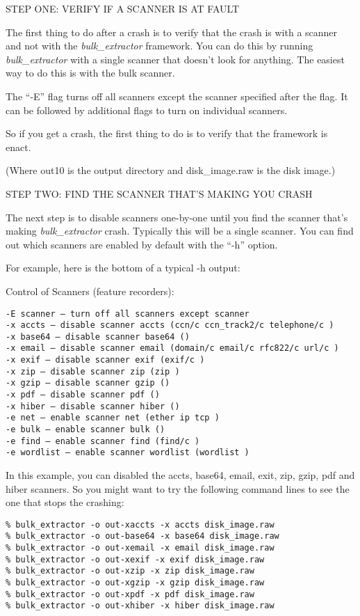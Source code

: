 \documentclass[10pt,twoside]{article}
\newcommand{\bulk}{\emph{bulk\_extractor}\xspace}
\begin{document}
STEP ONE: VERIFY IF A SCANNER IS AT FAULT

The first thing to do after a crash is to verify that the crash is with a scanner and not with the \bulk framework. You can do this by running \bulk with a single scanner that doesn’t look for anything. The easiest way to do this is with the bulk scanner.

The “-E” flag turns off all scanners except the scanner specified after the flag. It can be followed by additional flags to turn on individual scanners.

So if you get a crash, the first thing to do is to verify that the framework is enact.


(Where out10 is the output directory and disk\_image.raw is the disk image.)

STEP TWO: FIND THE SCANNER THAT’S MAKING YOU CRASH

The next step is to disable scanners one-by-one until you find the scanner that’s making \bulk crash. Typically this will be a single scanner. You can find out which scanners are enabled by default with the “-h” option.

For example, here is the bottom of a typical -h output:

Control of Scanners (feature recorders):
\begin{verbatim}
-E scanner – turn off all scanners except scanner
-x accts – disable scanner accts (ccn/c ccn_track2/c telephone/c )
-x base64 – disable scanner base64 ()
-x email – disable scanner email (domain/c email/c rfc822/c url/c )
-x exif – disable scanner exif (exif/c )
-x zip – disable scanner zip (zip )
-x gzip – disable scanner gzip ()
-x pdf – disable scanner pdf ()
-x hiber – disable scanner hiber ()
-e net – enable scanner net (ether ip tcp )
-e bulk – enable scanner bulk ()
-e find – enable scanner find (find/c )
-e wordlist – enable scanner wordlist (wordlist )
\end{verbatim}

In this example, you can disabled the accts, base64, email, exit, zip, gzip, pdf and hiber scanners. So you might want to try the following command lines to see the one that stops the crashing:

\begin{verbatim}
% bulk_extractor -o out-xaccts -x accts disk_image.raw
% bulk_extractor -o out-base64 -x base64 disk_image.raw
% bulk_extractor -o out-xemail -x email disk_image.raw
% bulk_extractor -o out-xexif -x exif disk_image.raw
% bulk_extractor -o out-xzip -x zip disk_image.raw
% bulk_extractor -o out-xgzip -x gzip disk_image.raw
% bulk_extractor -o out-xpdf -x pdf disk_image.raw
% bulk_extractor -o out-xhiber -x hiber disk_image.raw
\end{verbatim}
\end{document}
